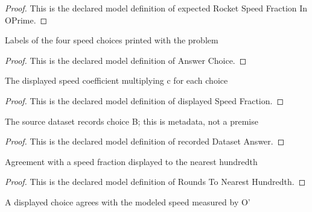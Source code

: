 \begin{proof}
  This is the declared model definition of expected Rocket Speed Fraction In OPrime.
\end{proof}
\begin{definition}
  \label{def:physics:phyx-mini-0565:phyxminiproblems-problemphyxmini0565-answerchoice}
  Labels of the four speed choices printed with the problem
\end{definition}
\begin{proof}
  This is the declared model definition of Answer Choice.
\end{proof}
\begin{definition}
  \label{def:physics:phyx-mini-0565:phyxminiproblems-problemphyxmini0565-displayedspeedfraction}
  The displayed speed coefficient multiplying c for each choice
\end{definition}
\begin{proof}
  This is the declared model definition of displayed Speed Fraction.
\end{proof}
\begin{definition}
  \label{def:physics:phyx-mini-0565:phyxminiproblems-problemphyxmini0565-recordeddatasetanswer}
  The source dataset records choice B; this is metadata, not a premise
\end{definition}
\begin{proof}
  This is the declared model definition of recorded Dataset Answer.
\end{proof}
\begin{definition}
  \label{def:physics:phyx-mini-0565:phyxminiproblems-problemphyxmini0565-roundstonearesthundredth}
  Agreement with a speed fraction displayed to the nearest hundredth
\end{definition}
\begin{proof}
  This is the declared model definition of Rounds To Nearest Hundredth.
\end{proof}
\begin{definition}
  \label{def:physics:phyx-mini-0565:phyxminiproblems-problemphyxmini0565-matchesanswerchoice}
  A displayed choice agrees with the modeled speed measured by O'
\end{definition}
